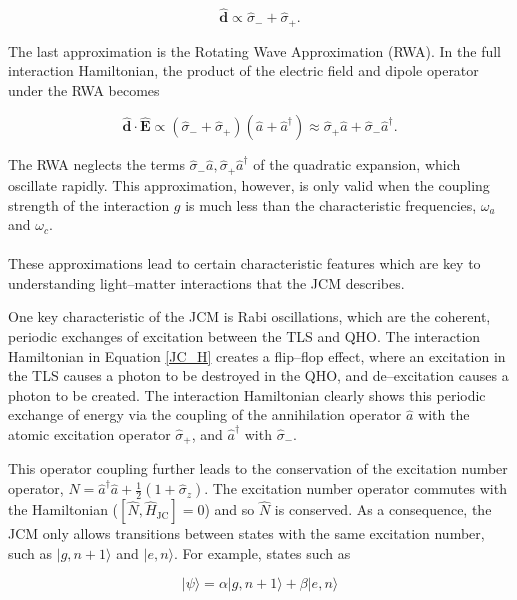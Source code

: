 \documentclass[12pt]{article}
\begin{document}
\begin{equation*}
    \boldsymbol{\hat{d}}  \propto \hat{\sigma}_{-} + \hat{\sigma}_{+}.
\end{equation*}

The last approximation is the Rotating Wave Approximation (RWA). In the full interaction Hamiltonian, the product of the electric field and dipole operator under the RWA becomes

\begin{equation}
    \boldsymbol{\hat{d}} \cdot \boldsymbol{\hat{E}} \propto (\hat{\sigma}_{-} + \hat{\sigma}_{+})(\hat{a} + \hat{a}^\dagger) \approx \hat{\sigma}_{+}\hat{a} +\hat{\sigma}_{-}\hat{a}^\dagger. 
\end{equation}

The RWA neglects the terms $\hat{\sigma}_{-}\hat{a}, \hat{\sigma}_{+}\hat{a}^\dagger$ of the quadratic expansion, which oscillate rapidly. This approximation, however, is only valid when the coupling strength of the interaction $g$ is much less than the characteristic frequencies, $\omega_a$ and $\omega_c$. \\
\\
These approximations lead to certain characteristic features which are key to understanding light--matter interactions that the JCM describes. 

One key characteristic of the JCM is Rabi oscillations, which are the coherent, periodic exchanges of excitation between the TLS and QHO. The interaction Hamiltonian in Equation \eqref{JC_H} creates a flip--flop effect, where an excitation in the TLS causes a photon to be destroyed in the QHO, and de--excitation causes a photon to be created. The interaction Hamiltonian clearly shows this periodic exchange of energy via the coupling of the annihilation operator $\hat{a}$ with the atomic excitation operator $\hat{\sigma}_+$, and $\hat{a}^\dagger$ with $\hat{\sigma}_-$.

This operator coupling further leads to the conservation of the excitation number operator, $\hat{N} = \hat{a}^\dagger \hat{a} + \frac{1}{2}(1 + \hat{\sigma}_z)$. The excitation number operator commutes with the Hamiltonian ($[\hat{N}, \hat{H}_{\scriptscriptstyle \text{JC}}] = 0$) and so $\hat{N}$ is conserved. As a consequence, the JCM only allows transitions between states with the same excitation number, such as $|g, n+1\rangle$ and $|e,n\rangle$. For example, states such as

\begin{equation}
    |\psi\rangle = \alpha|g,n+1\rangle + \beta|e,n\rangle
\end{equation}
\end{document}
